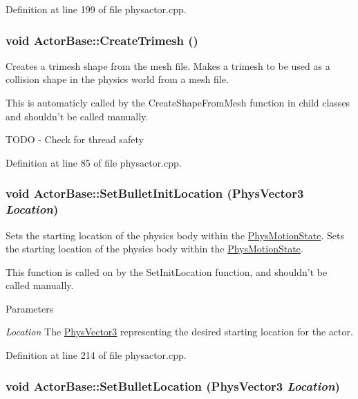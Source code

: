 Definition at line 199 of file physactor.cpp.\hypertarget{classActorBase_af7f0806222c79b5d5120dccefd93715e}{
\subsubsection[{CreateTrimesh}]{\setlength{\rightskip}{0pt plus 5cm}void ActorBase::CreateTrimesh ()}}
\label{dd/d7b/classActorBase_af7f0806222c79b5d5120dccefd93715e}


Creates a trimesh shape from the mesh file. Makes a trimesh to be used as a collision shape in the physics world from a mesh file. \par
 This is automaticly called by the CreateShapeFromMesh function in child classes and shouldn't be called manually. 

TODO -\/ Check for thread safety 

Definition at line 85 of file physactor.cpp.\hypertarget{classActorBase_af52177760d530df2b0987ed8626a656d}{
\subsubsection[{SetBulletInitLocation}]{\setlength{\rightskip}{0pt plus 5cm}void ActorBase::SetBulletInitLocation ({\bf PhysVector3} {\em Location})}}
\label{dd/d7b/classActorBase_af52177760d530df2b0987ed8626a656d}


Sets the starting location of the physics body within the \hyperlink{classPhysMotionState}{PhysMotionState}. Sets the starting location of the physics body within the \hyperlink{classPhysMotionState}{PhysMotionState}. \par
 This function is called on by the SetInitLocation function, and shouldn't be called manually. 
\begin{DoxyParams}{Parameters}
\item[{\em Location}]The \hyperlink{classPhysVector3}{PhysVector3} representing the desired starting location for the actor. \end{DoxyParams}


Definition at line 214 of file physactor.cpp.\hypertarget{classActorBase_af64a57138bbd32c52581a5c8d0d29a76}{
\subsubsection[{SetBulletLocation}]{\setlength{\rightskip}{0pt plus 5cm}void ActorBase::SetBulletLocation ({\bf PhysVector3} {\em Location})}}
\label{dd/d7b/classActorBase_af64a57138bbd32c52581a5c8d0d29a76}



